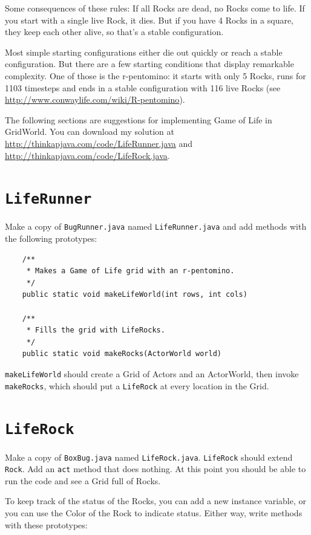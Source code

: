 \documentclass[12pt]{book}
\theoremstyle{exercise}
\begin{document}
Some consequences of these rules:
If all Rocks are dead, no Rocks come to life.  If you start with a
single live Rock, it dies.  But if you have 4 Rocks in a square, they
keep each other alive, so that's a stable configuration.

Most simple starting configurations either die out quickly or reach a
stable configuration.  But there are a few starting conditions that
display remarkable complexity.  One of those is the r-pentomino: it
starts with only 5 Rocks, runs for 1103 timesteps and ends in a stable
configuration with 116 live Rocks (see
\url{http://www.conwaylife.com/wiki/R-pentomino}).

The following sections are suggestions for implementing Game of Life
in GridWorld.  You can download my solution at
\url{http://thinkapjava.com/code/LifeRunner.java} and
\url{http://thinkapjava.com/code/LifeRock.java}.


\section{{\tt LifeRunner}}

Make a copy of {\tt BugRunner.java} named {\tt LifeRunner.java}
and add methods with the following prototypes:

\begin{lstlisting}
    /**
     * Makes a Game of Life grid with an r-pentomino.
     */
    public static void makeLifeWorld(int rows, int cols)

    /**
     * Fills the grid with LifeRocks.
     */
    public static void makeRocks(ActorWorld world)
\end{lstlisting}

{\tt makeLifeWorld} should create a Grid of Actors and an ActorWorld,
then invoke {\tt makeRocks}, which should put a {\tt LifeRock} at
every location in the Grid.


\section{{\tt LifeRock}}

Make a copy of {\tt BoxBug.java} named {\tt LifeRock.java}.
{\tt LifeRock} should extend {\tt Rock}.  Add an {\tt act} method
that does nothing.  At this point you should be able to run the
code and see a Grid full of Rocks.

To keep track of the status of the Rocks, you can add a new instance
variable, or you can use the Color of the Rock to indicate status.
Either way, write methods with these prototypes:
\end{document}
